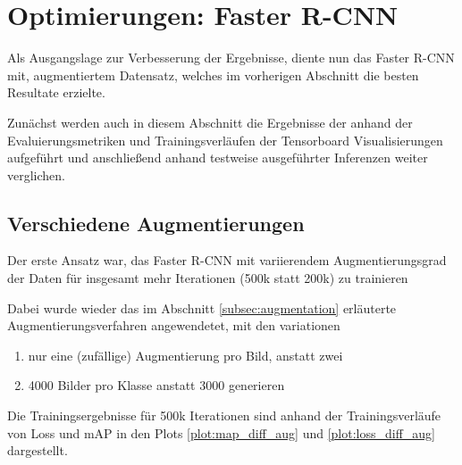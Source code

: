 \section{Optimierungen: Faster R-CNN}\label{sec:optimierung_faster_rcnn}

Als Ausgangslage zur Verbesserung der Ergebnisse, diente 
nun das Faster R-CNN mit, augmentiertem Datensatz, welches 
im vorherigen Abschnitt die besten Resultate erzielte.

Zunächst werden auch in diesem Abschnitt die Ergebnisse der 
anhand der Evaluierungsmetriken und Trainingsverläufen 
der Tensorboard Visualisierungen aufgeführt und anschließend
anhand testweise ausgeführter Inferenzen weiter verglichen.




\subsection{Verschiedene Augmentierungen}

Der erste Ansatz war, das Faster R-CNN mit 
variierendem Augmentierungsgrad der Daten für insgesamt
mehr Iterationen (500k statt 200k) zu trainieren 

Dabei wurde wieder das im Abschnitt \ref{subsec:augmentation} 
erläuterte Augmentierungsverfahren angewendetet, mit den variationen
\begin{enumerate}
  \item nur eine (zufällige) Augmentierung pro Bild, anstatt zwei
  \item 4000 Bilder pro Klasse anstatt 3000 generieren
\end{enumerate}

Die Trainingsergebnisse für 500k Iterationen sind anhand der 
Trainingsverläufe von Loss und mAP in den Plots
\ref{plot:map_diff_aug} und \ref{plot:loss_diff_aug} dargestellt.

\vspace{1cm}

\begin{minipage}{0.5\textwidth}
  \centering
  \label{plot:map_diff_aug}
  \def\svgwidth{0.9\textwidth}
  
\end{minipage}
\begin{minipage}{0.5\textwidth}
  \centering
  \label{plot:loss_diff_aug}
  \def\svgwidth{0.9\textwidth}
  
\end{minipage}

